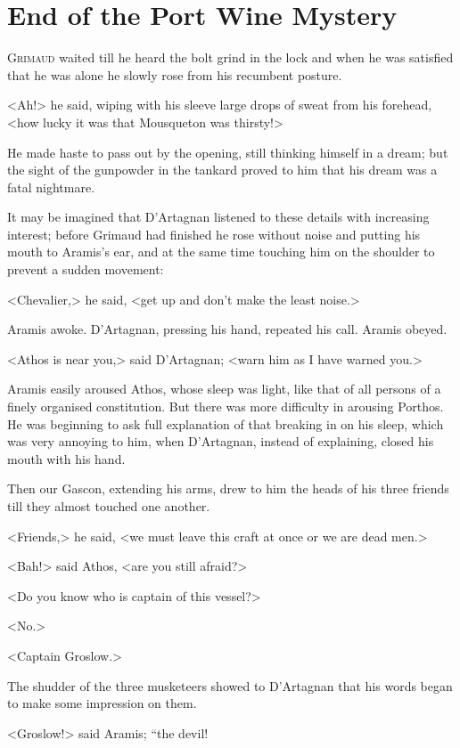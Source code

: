 \chapter{End of the Port Wine Mystery}

 \lettrine{G}{rimaud} waited till he heard the bolt grind in the lock and when he was satisfied that he was alone he slowly rose from his recumbent posture.

\zz
<Ah!> he said, wiping with his sleeve large drops of sweat from his forehead, <how lucky it was that Mousqueton was thirsty!>

He made haste to pass out by the opening, still thinking himself in a dream; but the sight of the gunpowder in the tankard proved to him that his dream was a fatal nightmare.

It may be imagined that D'Artagnan listened to these details with increasing interest; before Grimaud had finished he rose without noise and putting his mouth to Aramis's ear, and at the same time touching him on the shoulder to prevent a sudden movement:

<Chevalier,> he said, <get up and don't make the least noise.>

Aramis awoke. D'Artagnan, pressing his hand, repeated his call. Aramis obeyed.

<Athos is near you,> said D'Artagnan; <warn him as I have warned you.>

Aramis easily aroused Athos, whose sleep was light, like that of all persons of a finely organised constitution. But there was more difficulty in arousing Porthos. He was beginning to ask full explanation of that breaking in on his sleep, which was very annoying to him, when D'Artagnan, instead of explaining, closed his mouth with his hand.

Then our Gascon, extending his arms, drew to him the heads of his three friends till they almost touched one another.

<Friends,> he said, <we must leave this craft at once or we are dead men.>

<Bah!> said Athos, <are you still afraid?>

<Do you know who is captain of this vessel?>

<No.>

<Captain Groslow.>

The shudder of the three musketeers showed to D'Artagnan that his words began to make some impression on them.

<Groslow!> said Aramis; “the devil!

